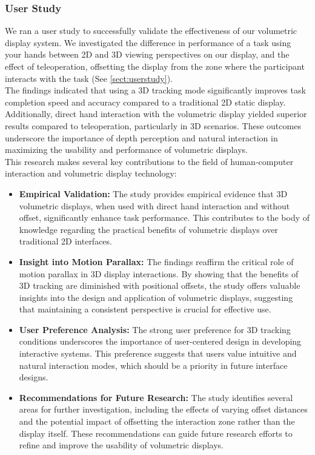 \subsubsection{User Study}

We ran a user study to successfully validate the effectiveness of our volumetric display system. We investigated the difference in performance of a task using your hands between 2D and 3D viewing perspectives on our display, and the effect of teleoperation, offsetting the display from the zone where the participant interacts with the task (See \ref{sect:userstudy}). \\

The findings indicated that using a 3D tracking mode significantly improves task completion speed and accuracy compared to a traditional 2D static display. Additionally, direct hand interaction with the volumetric display yielded superior results compared to teleoperation, particularly in 3D scenarios. These outcomes underscore the importance of depth perception and natural interaction in maximizing the usability and performance of volumetric displays. \\

This research makes several key contributions to the field of human-computer interaction and volumetric display technology:

\begin{itemize}
    \item \textbf{Empirical Validation:} The study provides empirical evidence that 3D volumetric displays, when used with direct hand interaction and without offset, significantly enhance task performance. This contributes to the body of knowledge regarding the practical benefits of volumetric displays over traditional 2D interfaces.

    \item \textbf{Insight into Motion Parallax:} The findings reaffirm the critical role of motion parallax in 3D display interactions. By showing that the benefits of 3D tracking are diminished with positional offsets, the study offers valuable insights into the design and application of volumetric displays, suggesting that maintaining a consistent perspective is crucial for effective use.

    \item \textbf{User Preference Analysis:} The strong user preference for 3D tracking conditions underscores the importance of user-centered design in developing interactive systems. This preference suggests that users value intuitive and natural interaction modes, which should be a priority in future interface designs.

    \item \textbf{Recommendations for Future Research:} The study identifies several areas for further investigation, including the effects of varying offset distances and the potential impact of offsetting the interaction zone rather than the display itself. These recommendations can guide future research efforts to refine and improve the usability of volumetric displays.
\end{itemize}
